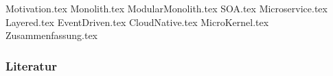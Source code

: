 \documentclass[aspectratio=\BeamerAspectRatio]{beamer}
\begin{document}
\maketitlepage %
\makesectionpopup %

{Motivation.tex}
{Monolith.tex}
{ModularMonolith.tex}
{SOA.tex}
{Microservice.tex}
{Layered.tex}
{EventDriven.tex}
{CloudNative.tex}
{MicroKernel.tex}
{Zusammenfassung.tex}

\begin{frame}[allowframebreaks]
    \frametitle{Literatur}
    \printbibliography
\end{frame}
\end{document}
